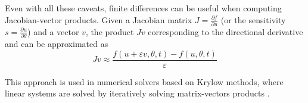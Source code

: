 Even with all these caveats, finite differences can be useful when computing Jacobian-vector products. 
Given a Jacobian matrix $J = \frac{\partial f}{\partial u}$ (or the sensitivity $s = \frac{\partial u}{\partial \theta}$) and a vector $v$, the product $Jv$ corresponding to the directional derivative and can be approximated as 
\begin{equation}
    Jv \approx \frac{f(u + \varepsilon v, \theta, t) - f(u, \theta, t)}{\varepsilon}
\end{equation}

This approach is used in numerical solvers based on Krylow methods, where linear systems are solved by iteratively solving matrix-vectors products \cite{Ipsen_Meyer_1998}.


